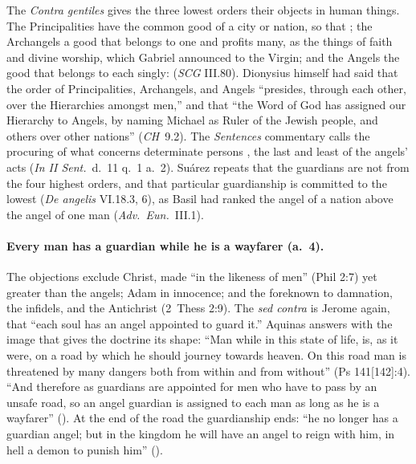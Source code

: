 The \emph{Contra gentiles} gives the three lowest orders their objects in
human things. The Principalities have the common good of a city or nation,
so that ; the Archangels a
good that belongs to one and profits many, as the things of faith and
divine worship, which Gabriel announced to the Virgin; and the Angels the
good that belongs to each singly:  (\emph{SCG} III.80). Dionysius himself had said that
the order of Principalities, Archangels, and Angels ``presides, through each
other, over the Hierarchies amongst men,'' and that ``the Word of God has
assigned our Hierarchy to Angels, by naming Michael as Ruler of the Jewish
people, and others over other nations'' (\emph{CH}~9.2). The
\emph{Sentences} commentary calls the procuring of what concerns determinate
persons , the last and least
of the angels' acts (\emph{In II Sent.}\ d.~11 q.~1 a.~2). Suárez repeats that the guardians are not from the four
highest orders, and that particular guardianship is committed to the lowest
(\emph{De angelis} VI.18.3, 6), as Basil had ranked the angel of a nation
above the angel of one man (\emph{Adv.\ Eun.}\ III.1).

\paragraph{Every man has a guardian while he is a wayfarer (a.~4).} The
objections exclude Christ, made ``in the likeness of men'' (Phil 2:7) yet
greater than the angels; Adam in innocence; and the foreknown to damnation,
the infidels, and the Antichrist (2~Thess 2:9). The \emph{sed contra} is Jerome again, that ``each
soul has an angel appointed to guard it.'' Aquinas answers with the image
that gives the doctrine its shape: ``Man while in this state of life, is, as
it were, on a road by which he should journey towards heaven. On this road
man is threatened by many dangers both from within and from without''
(Ps 141[142]:4). ``And therefore as guardians are appointed for men who have to
pass by an unsafe road, so an angel guardian is assigned to each man as long
as he is a wayfarer'' (). At the end of the road
the guardianship ends: ``he no longer has a guardian angel; but in the
kingdom he will have an angel to reign with him, in hell a demon to punish
him'' ().

